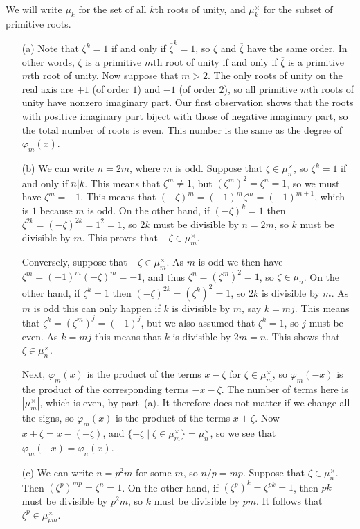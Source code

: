 \documentclass{amsart}
\newcommand{\zt}        {\zeta}
\newcommand{\vph}       {\varphi}
\newcommand{\ov}[1]     {\overline{#1}}
\newcommand{\st}        {\;|\;}
\newcommand{\tm}        {\times}
\renewcommand{\:}{\colon}
\newenvironment{solution}{\SolutionInline}{\endSolutionInline}
\theoremstyle{definition}
\renewenvironment{solution}{\SolutionAtEnd}{\endSolutionAtEnd}
\begin{document}
\begin{solution}
 We will write $\mu_k$ for the set of all $k$th roots of unity, and
 $\mu_k^\tm$ for the subset of primitive roots.
 \begin{itemize}
  \item[(a)] Note that $\zt^k=1$ if and only if $\ov{\zt}^k=1$, so
   $\zt$ and $\ov{\zt}$ have the same order.  In other words, $\zt$ is
   a primitive $m$th root of unity if and only if $\ov{\zt}$ is a
   primitive $m$th root of unity.  Now suppose that $m>2$.  The only
   roots of unity on the real axis are $+1$ (of order $1$) and $-1$
   (of order $2$), so all primitive $m$th roots of unity have nonzero
   imaginary part.  Our first observation shows that the roots with
   positive imaginary part biject with those of negative imaginary
   part, so the total number of roots is even.  This number is the
   same as the degree of $\vph_m(x)$.
  \item[(b)] We can write $n=2m$, where $m$ is odd.  Suppose that
   $\zt\in\mu_n^\tm$, so $\zt^k=1$ if and only if $n|k$.  This means
   that $\zt^m\neq 1$, but $(\zt^m)^2=\zt^n=1$, so we must have
   $\zt^m=-1$.  This means that $(-\zt)^m=(-1)^m\zt^m=(-1)^{m+1}$,
   which is $1$ because $m$ is odd.  On the other hand, if
   $(-\zt)^k=1$ then $\zt^{2k}=(-\zt)^{2k}=1^2=1$, so $2k$ must be
   divisible by $n=2m$, so $k$ must be divisible by $m$.  This proves
   that $-\zt\in\mu_m^\tm$.

   Conversely, suppose that $-\zt\in\mu_m^\tm$.  As $m$ is odd we then
   have $\zt^m=(-1)^m(-\zt)^m=-1$, and thus $\zt^n=(\zt^m)^2=1$, so
   $\zt\in\mu_n$.  On the other hand, if $\zt^k=1$ then
   $(-\zt)^{2k}=(\zt^k)^2=1$, so $2k$ is divisible by $m$.  As $m$ is
   odd this can only happen if $k$ is divisible by $m$, say $k=mj$.
   This means that $\zt^k=(\zt^m)^j=(-1)^j$, but we also assumed that
   $\zt^k=1$, so $j$ must be even.  As $k=mj$ this means that $k$ is
   divisible by $2m=n$.  This shows that $\zt\in\mu_n^\tm$.

   Next, $\vph_m(x)$ is the product of the terms $x-\zt$ for
   $\zt\in\mu_m^\tm$, so $\vph_m(-x)$ is the product of the
   corresponding terms $-x-\zt$.  The number of terms here is
   $|\mu_m^\tm|$, which is even, by part~(a).  It therefore does not
   matter if we change all the signs, so $\vph_m(x)$ is the product of
   the terms $x+\zt$.  Now $x+\zt=x-(-\zt)$, and
   $\{-\zt\st\zt\in\mu_m^\tm\}=\mu_n^\tm$, so we see that
   $\vph_m(-x)=\vph_n(x)$.

  \item[(c)] We can write $n=p^2m$ for some $m$, so $n/p=mp$.  
   Suppose that $\zt\in\mu_n^\tm$.   Then
   $(\zt^p)^{mp}=\zt^n=1$.  On the other hand, if
   $(\zt^p)^k=\zt^{pk}=1$, then $pk$ must be divisible by $p^2m$, so
   $k$ must be divisible by $pm$.  It follows that
   $\zt^p\in\mu_{pm}^\tm$.  


\end{itemize}
\end{solution}
\end{document}
